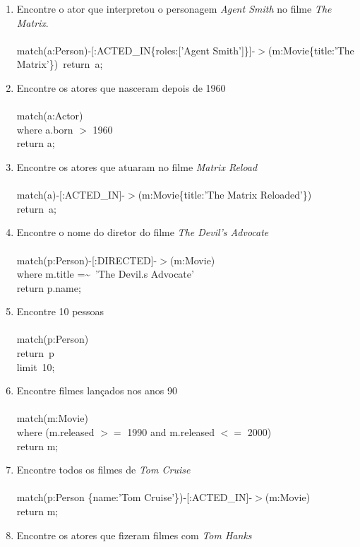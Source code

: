 \documentclass[a4paper, 12pt]{article}
\begin{document}
\begin{enumerate}
\item Encontre o ator que interpretou o personagem \emph{Agent Smith} no filme \emph{The Matrix}. \\ \\
  match(a:Person)-[:ACTED\_IN\{roles:['Agent Smith']\}]-$>$(m:Movie\{title:'The Matrix'\})\
  return\ a; \\
\item Encontre os atores que nasceram depois de 1960 \\ \\
match(a:Actor) \\
where a.born $>$ 1960 \\
return a;
\item Encontre os atores que atuaram no filme \emph{Matrix Reload} \\ \\
  match(a)-[:ACTED\_IN]-$>$(m:Movie\{title:'The Matrix Reloaded'\}) \\
  return\ a; \\
\item Encontre o nome do diretor do filme \emph{The Devil's Advocate} \\ \\
  match(p:Person)-[:DIRECTED]-$>$(m:Movie) \\
  where m.title =\textasciitilde\ 'The Devil.s Advocate' \\
  return p.name; \\
\item Encontre 10 pessoas \\ \\
  match(p:Person) \\
  return\ p \\
  limit\ 10; \\
\item Encontre filmes lançados nos anos 90 \\ \\
  match(m:Movie) \\
  where (m.released $>=$ 1990 and m.released $<=$ 2000) \\
  return m;
\item Encontre todos os filmes de \emph{Tom Cruise} \\ \\
  match(p:Person \{name:'Tom Cruise'\})-[:ACTED\_IN]-$>$(m:Movie) \\
  return m; \\
\item Encontre os atores que fizeram filmes com \emph{Tom Hanks} \\

\end{enumerate}
\end{document}
